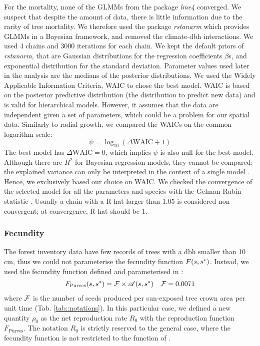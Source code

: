 For the mortality, none of the GLMMs from the package \textit{lme4} converged. We suspect that despite the amount of data, there is little information due to the rarity of tree mortality. We therefore used the package \textit{rstanarm} \citep{rstanarm} which provides GLMMs in a Bayesian framework, and removed the climate-dbh interactions. We used 4 chains and 3000 iterations for each chain. We kept the default priors of \textit{rstanarm}, that are Gaussian distributions for the regression coefficients $ \beta $s, and exponential distribution for the standard deviation. Parameter values used later in the analysis are the medians of the posterior distributions. We used the Widely Applicable Information Criteria, WAIC \citep[and reference therein]{Hooten2015} to chose the best model. WAIC is based on the posterior predictive distribution (the distribution to predict new data) and is valid for hierarchical models. However, it assumes that the data are independent given a set of parameters, which could be a problem for our spatial data. Similarly to radial growth, we compared the WAICs on the common logarithm scale:
\begin{equation} \label{eq::psi}
	\psi = \log_{10}(\Delta \text{WAIC} + 1)
\end{equation}
The best model has $ \Delta \text{WAIC} = 0 $, which implies $ \psi $ is also null for the best model. Although there are $ R^2 $ for Bayesian regression models, they cannot be compared: the explained variance can only be interpreted in the context of a single model \citep{Gelman2018}. Hence, we exclusively based our choice on WAIC. We checked the convergence of the selected model for all the parameters and species with the Gelman-Rubin statistic \citep[R-hat diagnostic]{Gelman1992}. Usually a chain with a R-hat larger than 1.05 is considered non-convergent; at convergence, R-hat should be 1.

\subsubsection{Fecundity}
The forest inventory data have few records of trees with a dbh smaller than 10 cm, thus we could not parameterise the fecundity function $ F(s, {s}^{*}) $. Instead, we used the fecundity function defined and parameterised in \citet{Purves2008}:
\begin{align} \label{eq::fecundity_fct}
	F_{\text{Purves}}(s, {s}^{*}) = \mathcal{F} \times \mathscr{A}(s, {s}^{*}) && \mathcal{F} = 0.0071
\end{align}
where $ \mathcal{F} $ is the number of seeds produced per sun-exposed tree crown area per unit time (Tab. \ref{tab::notations}). In this particular case, we defined a new quantity $ \rho_0 $ as the net reproduction rate $ R_0 $ with the reproduction function $ F_{\text{Purves}} $. The notation $ R_0 $ is strictly reserved to the general case, where the fecundity function is not restricted to the function of \citeauthor{Purves2008}.

